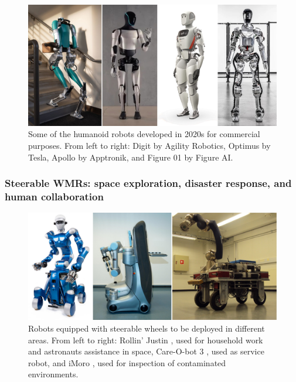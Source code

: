 \begin{figure}
    \centering
    \includegraphics[width=\textwidth]{figures/01-introduction/robots-in-2020.jpg}
    \caption{Some of the humanoid robots developed in 2020s for commercial
        purposes. From left to right:
        Digit by Agility Robotics, Optimus by Tesla, Apollo by Apptronik, and
        Figure 01 by Figure AI.
    }
    \label{fig:introduction:robots-in-2020}
\end{figure}

\subsubsection{Steerable WMRs: space exploration, disaster response, and human collaboration}
\begin{figure}
    \centering
    \includegraphics[width=\textwidth]{figures/01-introduction/SWMRs-1.jpg}
    \caption{Robots equipped with steerable wheels to be deployed in different areas.
        From left to right: Rollin' Justin \cite{Fuchs2009RollinJustin}, used 
        for household work and astronauts assistance in space, 
        Care-O-bot 3 \cite{Graf2009Care-O-bot3}, used as service robot, and
        iMoro \cite{Oftadeh2013iMoro}, used for inspection of contaminated
        environments.}
    \label{fig:introduction:SWMRs-1}
\end{figure}

